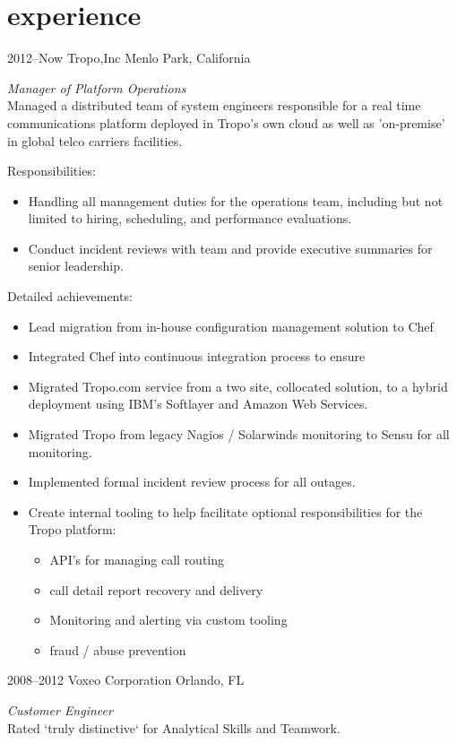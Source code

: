 \documentclass[]{friggeri-cv} %
\begin{document}

\section{experience}

  \begin{entrylist}
    \entry
      {2012--Now}
      {Tropo,Inc}
      {Menlo Park, California}
      {\emph{Manager of Platform Operations} \\
        Managed a distributed team of system engineers responsible for a real time communications platform deployed in Tropo's own cloud as well as 'on-premise' in global telco carriers facilities.

        Responsibilities:
        \begin{itemize}
          \item Handling all management duties for the operations team, including but not limited to hiring, scheduling, and performance evaluations.
          \item Conduct incident reviews with team and provide executive summaries for senior leadership.
        \end{itemize}

        Detailed achievements:
        \begin{itemize}
          \item Lead migration from in-house configuration management solution to Chef
          \item Integrated Chef into continuous integration process to ensure
          \item Migrated Tropo.com service from a two site, collocated solution, to a hybrid deployment using IBM's Softlayer and Amazon Web Services.
          \item Migrated Tropo from legacy Nagios / Solarwinds monitoring to Sensu for all monitoring.
          \item Implemented formal incident review process for all outages.
          \item Create internal tooling to help facilitate optional responsibilities for the Tropo platform:
            \begin{itemize}
              \item API's for managing call routing
              \item call detail report recovery and delivery
              \item Monitoring and alerting via custom tooling
              \item fraud / abuse prevention
            \end{itemize}
        \end{itemize}}
    \entry
      {2008--2012}
      {Voxeo Corporation}
      {Orlando, FL}
      {\emph{Customer Engineer} \\
      Rated `truly distinctive` for Analytical Skills and Teamwork.

}
\end{entrylist}
\end{document}
